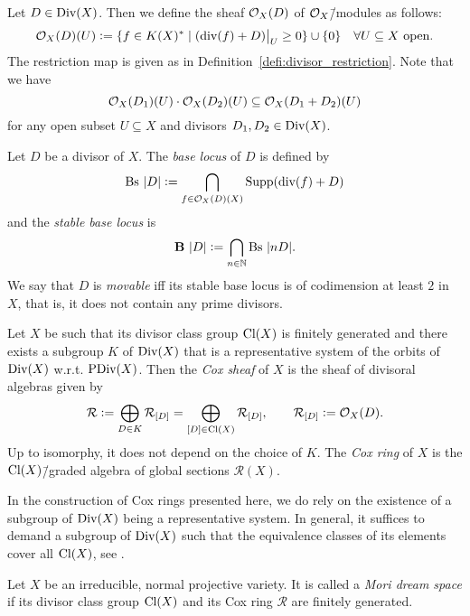 \begin{defi}
	Let $D\in\text{Div}(X)$. Then we define the sheaf $\mathcal{O}_X(D)$ of $\mathcal{O}_X$\=/modules as follows:
	$$\O_X(D)(U) \defeq \{f\in K(X)^*\mid (\div(f) + D)\restrict{U} \geq 0\} \cup \{0\}\quad \forall U\subseteq X\ \text{open}.$$
	The restriction map is given as in Definition~\ref{defi:divisor_restriction}. Note that we have 
	$$\mathcal{O}_X(D_1)(U)\cdot \mathcal{O}_X(D_2)(U) \subseteq \mathcal{O}_X(D_1 + D_2)(U)$$
	for any open subset $U\subseteq X$ and divisors $D_1,D_2\in\text{Div}(X)$.
\end{defi}

\begin{defi}
	Let $D$ be a divisor of $X$. The \emph{base locus} of $D$ is defined by
	$$\text{Bs}\ |D| \mathrel{\mathop:}= \bigcap_{f\in\mathcal{O}_X(D)(X)} \text{Supp}(\text{div}(f) + D)$$
	and the \emph{stable base locus} is
	$$\textbf{B}\ |D| \mathrel{\mathop:}= \bigcap_{n\in\mathbb{N}} \text{Bs}\ |nD|.$$
	We say that $D$ is \emph{movable} iff its stable base locus is of codimension at least $2$ in $X$, that is, it does not contain any prime divisors.
\end{defi}

\begin{defi}
	Let $X$ be such that its divisor class group $\text{Cl}(X)$ is finitely generated and there exists a subgroup $K$ of $\text{Div}(X)$ that is a representative system of the orbits of $\text{Div}(X)$ w.r.t. $\text{PDiv}(X)$. Then the \emph{Cox sheaf} of $X$ is the sheaf of divisoral algebras given by
	$$\mathcal{R} \mathrel{\mathop:}= \bigoplus_{D\in K} \mathcal{R}_{[D]} = \bigoplus_{[D]\in \text{Cl}(X)} \mathcal{R}_{[D]}, \quad\quad \mathcal{R}_{[D]} \mathrel{\mathop:}= \mathcal{O}_X(D).$$
	Up to isomorphy, it does not depend on the choice of $K$. The \emph{Cox ring} of $X$ is the $\text{Cl}(X)$\=/graded algebra of global sections $\mathcal{R}(X)$.
\end{defi}

In the construction of Cox rings presented here, we do rely on the existence of a subgroup of $\text{Div}(X)$ being a representative system. In general, it suffices to demand a subgroup of $\text{Div}(X)$ such that the equivalence classes of its elements cover all $\text{Cl}(X)$, see \cite[Construction 1.4.2.1]{cox_rings}.

\begin{defi}
	Let $X$ be an irreducible, normal projective variety. It is called a \emph{Mori dream space} if its divisor class group $\text{Cl}(X)$ and its Cox ring $\mathcal{R}$ are finitely generated.
\end{defi}

